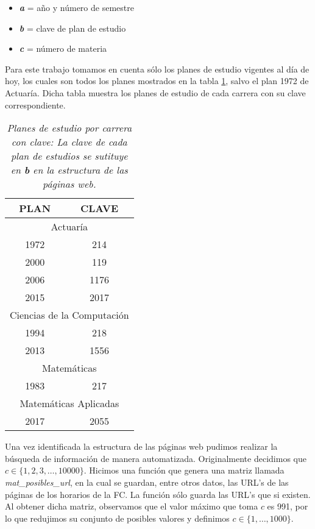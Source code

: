 \begin{itemize}
\item[ ] \textit{\textbf{a}} = año y número de semestre

\item[ ] \textit{\textbf{b}} = clave de plan de estudio

\item[ ] \textit{\textbf{c}} = número de materia
\end{itemize}

Para este trabajo tomamos en cuenta sólo los planes de estudio vigentes al día de hoy, los cuales son todos los planes mostrados en la tabla \tablename{\ref{PlanesEstudio}}, salvo el plan 1972 de Actuaría. Dicha tabla muestra los planes de estudio de cada carrera con su clave correspondiente.

\begin{table}[h]
\centering
\begin{tabular}{|c|c|}
 \hline 
  \textbf{PLAN} & \textbf{CLAVE} \\ 
 \hline 
 \multicolumn{2}{|c|}{Actuaría} \\ 
 \hline 
 1972 & 214 \\ 
 \hline 
 2000 & 119 \\ 
 \hline 
 2006 & 1176 \\ 
 \hline 
 2015 & 2017 \\ 
 \hline 
 \multicolumn{2}{|c|}{Ciencias de la Computación} \\ 
 \hline 
 1994 & 218 \\ 
 \hline 
 2013 & 1556 \\ 
 \hline 
 \multicolumn{2}{|c|}{Matemáticas} \\ 
 \hline 
 1983 & 217 \\ 
 \hline 
 \multicolumn{2}{|c|}{Matemáticas Aplicadas} \\ 
 \hline 
 2017 & 2055 \\ 
 \hline 
 \end{tabular}
\caption[\textit{Planes de estudio por carrera con clave}]{\textit{Planes de estudio por carrera con clave: La clave de cada plan de estudios se sutituye en \textbf{b} en la estructura de las páginas web.}}\label{PlanesEstudio}
\end{table}

Una vez identificada la estructura de las páginas web pudimos realizar la búsqueda de información de manera automatizada. Originalmente decidimos que $c \in \{1,2,3, \ldots, 10 000\}$. Hicimos una función que genera una matriz llamada \textit{mat\_posibles\_url}, en la cual se guardan, entre otros datos, las URL's de las páginas de los horarios de la FC. La función sólo guarda las URL's que si existen. Al obtener dicha matriz, observamos que el valor máximo que toma $c$ es 991, por lo que redujimos su conjunto de posibles valores y definimos $c \in \{1, \ldots, 1 000\}$.

